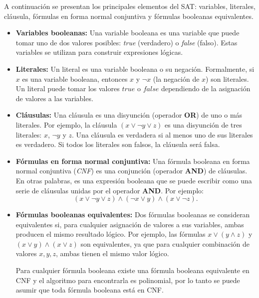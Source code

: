 A continuación se presentan los principales elementos del SAT: variables, literales, cláusula, fórmulas en forma normal conjuntiva y fórmulas booleanas equivalentes.

\begin{itemize}
  \item \textbf{Variables booleanas:}
        Una variable booleana es una variable que puede tomar uno de dos valores posibles: \textit{true} (verdadero) o \textit{false} (falso). Estas variables se utilizan para construir expresiones lógicas.
  \item \textbf{Literales:}
        Un literal es una variable booleana o su negación. Formalmente, si \( x \) es una variable booleana, entonces \( x \) y \( \neg x \) (la negación de \( x \)) son literales. Un literal puede tomar los valores \( true \) o \( false \) dependiendo de la asignación de valores a las variables.
  \item  \textbf{Cláusulas:}
        Una cláusula es una disyunción (operador \textbf{OR}) de uno o más literales. Por ejemplo, la cláusula \( (x \vee \neg y \vee z) \) es una disyunción de tres literales: \( x \), \( \neg y \) y \( z \). Una cláusula es verdadera si al menos uno de sus literales es verdadero. Si todos los literales son falsos, la cláusula será falsa.
  \item \textbf{Fórmulas en forma normal conjuntiva:}
        Una fórmula booleana en forma normal conjuntiva (\textit{CNF}) es una conjunción (operador \textbf{AND}) de cláusulas. En otras palabras, es una expresión booleana que se puede escribir como una serie de cláusulas unidas por el operador \textbf{AND}. Por ejemplo:        
        \[
          (x \vee \neg y \vee z) \wedge (\neg x \vee y) \wedge (x \vee \neg z).
        \]
  \item \textbf{Fórmulas booleanas equivalentes:}
        Dos fórmulas booleanas se consideran equivalentes si, para cualquier asignación de valores a sus variables, ambas producen el mismo resultado lógico. Por ejemplo, las fórmulas \( x \vee (y \wedge z) \) y \( (x \vee y) \wedge (x \vee z) \) son equivalentes, ya que para cualquier combinación de valores \( x, y, z \), ambas tienen el mismo valor lógico.
        
        Para cualquier fórmula booleana existe una fórmula booleana equivalente en CNF \cite{authomataTheory} y 
        el algoritmo para encontrarla es polinomial, por lo tanto se puede asumir que toda fórmula booleana está en CNF.
        
\end{itemize}

